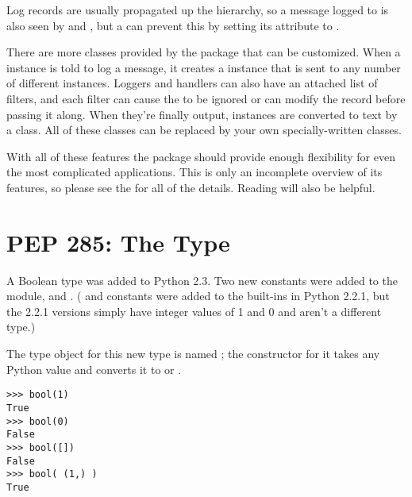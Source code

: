 \documentclass{howto}
\begin{document}
Log records are usually propagated up the hierarchy, so a message
logged to  is also seen by  and
, but a  can prevent this by setting its
 attribute to .

There are more classes provided by the  package that
can be customized.  When a  instance is told to log a
message, it creates a  instance that is sent to any
number of different  instances.  Loggers and handlers
can also have an attached list of filters, and each filter can cause
the  to be ignored or can modify the record before
passing it along.  When they're finally output, 
instances are converted to text by a  class.  All of
these classes can be replaced by your own specially-written classes.

With all of these features the  package should provide
enough flexibility for even the most complicated applications.  This
is only an incomplete overview of its features, so please see the
for all of the details.  Reading  will also be helpful.


\begin{seealso}


\end{seealso}


\section{PEP 285: The  Type\label{section-bool}}

A Boolean type was added to Python 2.3.  Two new constants were added
to the  module,  and
.  ( and
 constants were added to the built-ins
in Python 2.2.1, but the 2.2.1 versions simply have integer values of
1 and 0 and aren't a different type.)

The type object for this new type is named
; the constructor for it takes any Python value and
converts it to  or .

\begin{verbatim}
>>> bool(1)
True
>>> bool(0)
False
>>> bool([])
False
>>> bool( (1,) )
True
\end{verbatim}
\end{document}
